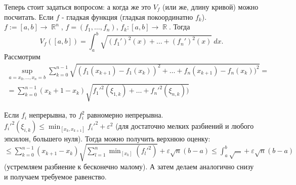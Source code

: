 \documentclass[a4paper,100pt]{article}
\theoremstyle{indented}
\theoremstyle{definition}
\theoremstyle{remark}
\DeclareMathOperator{\RR}{\mathbb{R}}
\begin{document}
Теперь стоит задаться вопросом: а когда же это $V_f$ (или же, длину кривой) можно посчитать. Если $f$ - гладкая функция (гладкая покоординатно $f_k$). $f:=[a, b]\rightarrow \RR^n$, $f=(f_1, \ldots, f_n)$, $f_k:[a, b]\rightarrow \RR$. Тогда
\[
    V_f([a, b])=\int_a^b\sqrt{(f_1')^2(x)+\ldots+(f_n')^2(x)}\: dx.
\]
Рассмотрим
\begin{eqnarray*}
    \sup_{a=x_0, \ldots, x_n=b}\sum_{k=0}^{n-1}\sqrt{(f_1(x_{k+1})-f_1(x_k))^2+\ldots+f_n(x_{k+1})-f_n(x_k))^2} = \\ 
    = \sum_{k=0}^{n-1}(x_k+1-x_k)\sqrt{f_1'^2(\xi_{1, k})+\ldots+f_n'^2(\xi_{n, k}))}
\end{eqnarray*}

Если $f_i$ непрерывна, то $f_i^2$ равномерно непрерывна. $f_i'^2(\xi_{i, k})\leq \min_{[x_k, x_{k+1}]}f_i'^2+\varepsilon^2$ (для достаточно мелких разбиений и любого эпсилон, большего нуля). Тогда можно получить верхнюю оценку: $\leq \sum_{k=0}^{n-1}(x_{k+1}-x_k)\sqrt{\sum_{l=1}^n \min_{[x_k]}(f_l'^2)}+\varepsilon \sqrt{n}(b-a)\leq \int_a^b\sqrt{\dots}+\varepsilon \sqrt{n}(b-a)$ (устремляем разбиение к бесконечно малому). А затем делаем аналогично снизу и получаем требуемое равенство.
\end{document}
